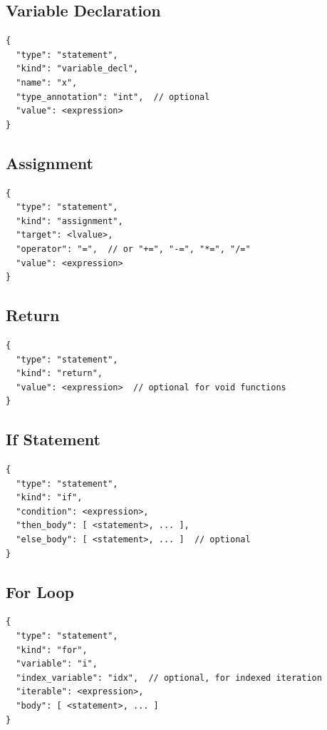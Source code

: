 \subsection{Variable Declaration}

\begin{lstlisting}[language={}]
{
  "type": "statement",
  "kind": "variable_decl",
  "name": "x",
  "type_annotation": "int",  // optional
  "value": <expression>
}
\end{lstlisting}

\subsection{Assignment}

\begin{lstlisting}[language={}]
{
  "type": "statement",
  "kind": "assignment",
  "target": <lvalue>,
  "operator": "=",  // or "+=", "-=", "*=", "/="
  "value": <expression>
}
\end{lstlisting}

\subsection{Return}

\begin{lstlisting}[language={}]
{
  "type": "statement",
  "kind": "return",
  "value": <expression>  // optional for void functions
}
\end{lstlisting}

\subsection{If Statement}

\begin{lstlisting}[language={}]
{
  "type": "statement",
  "kind": "if",
  "condition": <expression>,
  "then_body": [ <statement>, ... ],
  "else_body": [ <statement>, ... ]  // optional
}
\end{lstlisting}

\subsection{For Loop}

\begin{lstlisting}[language={}]
{
  "type": "statement",
  "kind": "for",
  "variable": "i",
  "index_variable": "idx",  // optional, for indexed iteration
  "iterable": <expression>,
  "body": [ <statement>, ... ]
}
\end{lstlisting}

